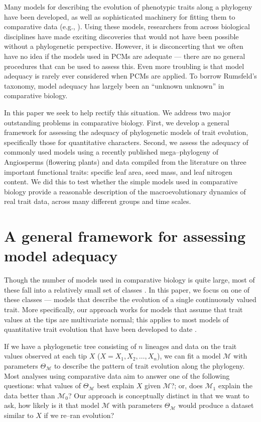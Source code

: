 \documentclass[a4paper,12pt]{article}
\begin{document}
Many models for describing the evolution of phenotypic traits along a phylogeny have been developed, as well as sophisticated machinery for fitting them to comparative data (e.g., \citep{Felsenstein1985, Hansen1997, Pagel1999, Blomberg2003, ButlerKing2004, Omeara2006, Eastman2011, Beaulieu2012, SlaterMEE, UyedaBayou}). Using these models, researchers from across biological disciplines have made exciting discoveries that would not have been possible without a phylogenetic perspective. However, it is disconcerting that we often have no idea if the models used in PCMs are adequate --- there are no general procedures that can be used to assess this. Even more troubling is that model adequacy is rarely ever considered when PCMs are applied. To borrow Rumsfeld's taxonomy, model adequacy has largely been an ``unknown unknown'' in comparative biology.

In this paper we seek to help rectify this situation. We address two major outstanding problems in comparative biology. First, we develop a general framework for assessing the adequacy of phylogenetic models of trait evolution, specifically those for quantitative characters. Second, we assess the adequacy of commonly used models using a recently published mega--phylogeny of Angiosperms (flowering plants) \citep{Zanne2013} and data compiled from the literature on three important functional traits: specific leaf area, seed mass, and leaf nitrogen content. We did this to test whether the simple models used in comparative biology provide a reasonable description of the macroevolutionary dynamics of real trait data, across many different groups and time scales.

\section{A general framework for assessing model adequacy}
Though the number of models used in comparative biology is quite large, most of these fall into a relatively small set of classes \citep{Omeara2012}. In this paper, we focus on one of these classes --- models that describe the evolution of a single continuously valued trait. More specifically, our approach works for models that assume that trait values at the tips are multivariate normal; this applies to most models of quantitative trait evolution that have been developed to date \citep{Omeara2012}.

If we have a phylogenetic tree consisting of $n$ lineages and data on the trait values observed at each tip $X$ ($X=X_1, X_2, \ldots, X_n$), we can fit a model $\mathcal{M}$ with parameters $\Theta_{\mathcal{M}}$ to describe the pattern of trait evolution along the phylogeny. Most analyses using comparative data aim to answer one of the following questions: what values of $\Theta_{\mathcal{M}}$ best explain $X$ given $\mathcal{M}$?; or, does $\mathcal{M}_1$ explain the data better than $\mathcal{M}_0$? Our approach is conceptually distinct in that we want to ask, how likely is it that model $\mathcal{M}$ with parameters $\Theta_{\mathcal{M}}$ would produce a dataset similar to $X$ if we re--ran evolution?
\end{document}
